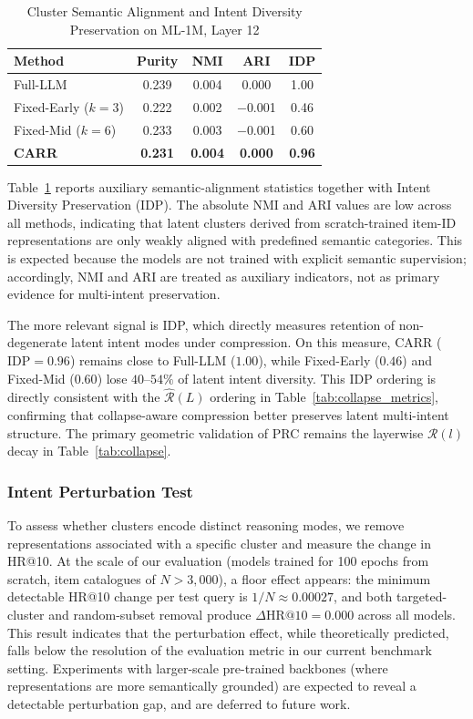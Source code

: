 \documentclass[lettersize,journal]{IEEEtran}
\begin{document}
\begin{table}[!t]
\caption{Cluster Semantic Alignment and Intent Diversity Preservation on ML-1M, Layer 12\label{tab:cluster}}
\centering
\begin{tabular}{l|ccc|c}
\toprule
\textbf{Method} & Purity & NMI & ARI & IDP \\
\midrule
Full-LLM & 0.239 & 0.004 & 0.000 & 1.00 \\
Fixed-Early ($k=3$) & 0.222 & 0.002 & $-$0.001 & 0.46 \\
Fixed-Mid ($k=6$) & 0.233 & 0.003 & $-$0.001 & 0.60 \\
\textbf{CARR} & \textbf{0.231} & \textbf{0.004} & \textbf{0.000} & \textbf{0.96} \\
\bottomrule
\end{tabular}
\end{table}

Table~\ref{tab:cluster} reports auxiliary semantic-alignment statistics together with Intent Diversity Preservation (IDP). The absolute NMI and ARI values are low across all methods, indicating that latent clusters derived from scratch-trained item-ID representations are only weakly aligned with predefined semantic categories. This is expected because the models are not trained with explicit semantic supervision; accordingly, NMI and ARI are treated as auxiliary indicators, not as primary evidence for multi-intent preservation.

The more relevant signal is IDP, which directly measures retention of non-degenerate latent intent modes under compression. On this measure, CARR ($\mathrm{IDP}=0.96$) remains close to Full-LLM ($1.00$), while Fixed-Early ($0.46$) and Fixed-Mid ($0.60$) lose $40$--$54\%$ of latent intent diversity. This IDP ordering is directly consistent with the $\widehat{\mathcal{R}}(L)$ ordering in Table~\ref{tab:collapse_metrics}, confirming that collapse-aware compression better preserves latent multi-intent structure. The primary geometric validation of PRC remains the layerwise $\mathcal{R}(l)$ decay in Table~\ref{tab:collapse}.

\subsubsection{Intent Perturbation Test}
To assess whether clusters encode distinct reasoning modes, we remove representations associated with a specific cluster and measure the change in HR@10.
At the scale of our evaluation (models trained for 100 epochs from scratch, item catalogues of $N > 3{,}000$), a floor effect appears: the minimum detectable HR@10 change per test query is $1/N \approx 0.00027$, and both targeted-cluster and random-subset removal produce $\Delta\text{HR@10} = 0.000$ across all models. This result indicates that the perturbation effect, while theoretically predicted, falls below the resolution of the evaluation metric in our current benchmark setting. Experiments with larger-scale pre-trained backbones (where representations are more semantically grounded) are expected to reveal a detectable perturbation gap, and are deferred to future work.
\end{document}
